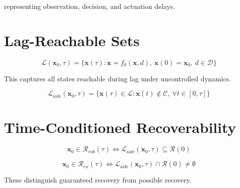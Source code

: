 \documentclass[letterpaper, 10 pt, conference]{ieeeconf}
\begin{document}
representing observation, decision, and actuation delays.

\section{Lag-Reachable Sets}

\begin{definition}
\begin{equation}
\mathcal{L}(\mathbf{x}_0,\tau) =
\{ \mathbf{x}(\tau) : \dot{\mathbf{x}} = f_0(\mathbf{x},d),\ \mathbf{x}(0)=\mathbf{x}_0,\ d \in \mathcal{D} \}
\end{equation}
\end{definition}

This captures all states reachable during lag under uncontrolled dynamics.

\begin{definition}
\begin{equation}
\mathcal{L}_{\text{safe}}(\mathbf{x}_0,\tau) =
\{ \mathbf{x}(\tau) \in \mathcal{L} : \mathbf{x}(t)\notin\mathcal{C},\ \forall t\in[0,\tau] \}
\end{equation}
\end{definition}

\section{Time-Conditioned Recoverability}

\begin{definition}
\begin{equation}
\mathbf{x}_0 \in \mathcal{R}_{rob}(\tau)
\iff
\mathcal{L}_{\text{safe}}(\mathbf{x}_0,\tau) \subseteq \mathcal{R}(0)
\end{equation}
\end{definition}

\begin{definition}
\begin{equation}
\mathbf{x}_0 \in \mathcal{R}_{ex}(\tau)
\iff
\mathcal{L}_{\text{safe}}(\mathbf{x}_0,\tau) \cap \mathcal{R}(0) \neq \emptyset
\end{equation}
\end{definition}

These distinguish guaranteed recovery from possible recovery.
\end{document}
